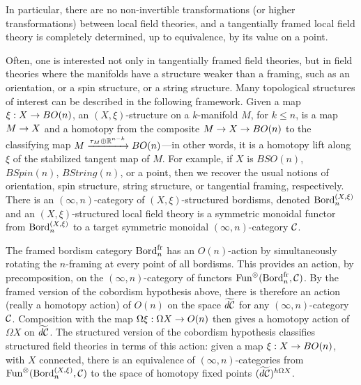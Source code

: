 \documentclass{amsart}
\begin{document}
\noindent In particular, there are no non-invertible transformations (or higher transformations) between local field theories, and a tangentially framed local field theory is completely determined, up to equivalence, by its value on a point.

Often, one is interested not only in tangentially framed field theories, but in field theories where the manifolds have a structure weaker than a framing, such as an orientation, or a spin structure, or a string structure.  Many topological structures of interest can be described in the following framework.  Given a map $\xi : X \rightarrow BO(n)$, an $(X,\xi)$-structure on a $k$-manifold $M$, for $k \leq n$, is a map $M \rightarrow X$ and a homotopy from the composite $M \rightarrow X \rightarrow BO(n)$ to the classifying map $M \xrightarrow{\tau_M \oplus \mathbb R^{n-k}} BO(n)$---in other words, it is a homotopy lift along $\xi$ of the stabilized tangent map of $M$.  For example, if $X$ is $BSO(n)$, $BSpin(n)$, $BString(n)$, or a point, then we recover the usual notions of orientation, spin structure, string structure, or tangential framing, respectively.  There is an $(\infty,n)$-category of $(X,\xi)$-structured bordisms, denoted $\mathrm{Bord}^{(X,\xi)}_n$ and an $(X,\xi)$-structured local field theory is a symmetric monoidal functor from $\mathrm{Bord}^{(X,\xi)}_n$ to a target symmetric monoidal $(\infty,n)$-category $\mathcal C$.

The framed bordism category $\mathrm{Bord}^\mathrm{fr}_n$ has an $O(n)$-action by simultaneously rotating the $n$-framing at every point of all bordisms.  This provides an action, by precomposition, on the $(\infty,n)$-category of functors $\operatorname{Fun}^\otimes(\mathrm{Bord}^\mathrm{fr}_n,\mathcal C)$.  By the framed version of the cobordism hypothesis above, there is therefore an action (really a homotopy action) of $O(n)$ on the space $\widetilde{d\mathcal C}$ for any $(\infty,n)$-category $\mathcal C$.  Composition with the map $\Omega \xi: \Omega X \rightarrow O(n)$ then gives a homotopy action of $\Omega X$ on $\widetilde{d\mathcal C}$.  The structured version of the cobordism hypothesis classifies structured field theories in terms of this action: given a map $\xi: X \rightarrow BO(n)$, with $X$ connected, there is an equivalence of $(\infty,n)$-categories from $\operatorname{Fun}^\otimes(\mathrm{Bord}_n^{(X,\xi)},\mathcal C)$ to the space of homotopy fixed points $(\widetilde{d\mathcal C})^{h\Omega X}$.





\end{document}

